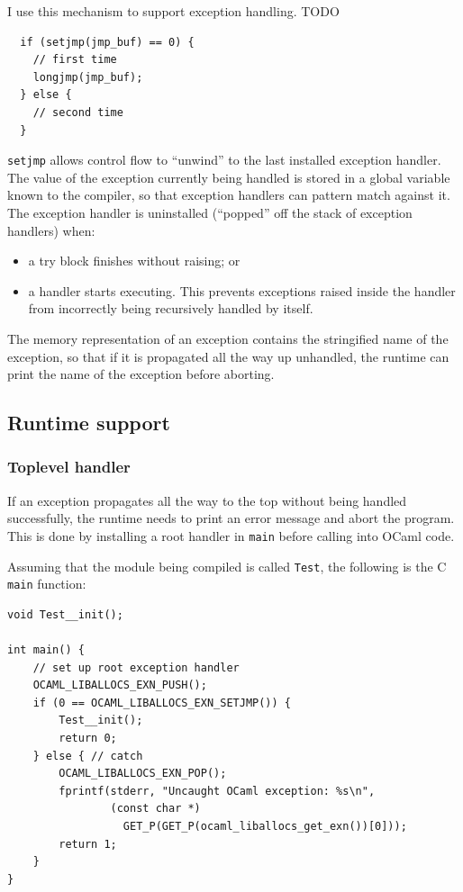 \documentclass[12pt,a4paper,twoside,openright]{report}
\begin{document}
I use this mechanism to support exception handling. TODO

\begin{lstlisting}
  if (setjmp(jmp_buf) == 0) {
    // first time
    longjmp(jmp_buf);
  } else {
    // second time
  }
\end{lstlisting}

\lstinline!setjmp! allows control flow to ``unwind'' to the last installed
exception handler. The value of the exception currently being handled is stored
in a global variable known to the compiler, so that exception handlers can
pattern match against it. The exception handler is uninstalled (``popped'' off
the stack of exception handlers) when:
\begin{itemize}
  \item a try block finishes without raising; or
  \item a handler starts executing. This prevents exceptions raised inside the
      handler from incorrectly being recursively handled by itself.
\end{itemize}

The memory representation of an exception contains the stringified name of the
exception, so that if it is propagated all the way up unhandled, the runtime
can print the name of the exception before aborting.

\subsection{Runtime support}\label{exceptions-runtime-support}

\subsubsection{Toplevel handler}

If an exception propagates all the way to the top without being handled
successfully, the runtime needs to print an error message and abort the
program. This is done by installing a root handler in \lstinline!main! before
calling into OCaml code.

Assuming that the module being compiled is called \lstinline!Test!, the
following is the C \lstinline!main! function:

\begin{lstlisting}
void Test__init();

int main() {
    // set up root exception handler
    OCAML_LIBALLOCS_EXN_PUSH();
    if (0 == OCAML_LIBALLOCS_EXN_SETJMP()) {
        Test__init();
        return 0;
    } else { // catch
        OCAML_LIBALLOCS_EXN_POP();
        fprintf(stderr, "Uncaught OCaml exception: %s\n",
                (const char *)
                  GET_P(GET_P(ocaml_liballocs_get_exn())[0]));
        return 1;
    }
}
\end{lstlisting}
\end{document}

